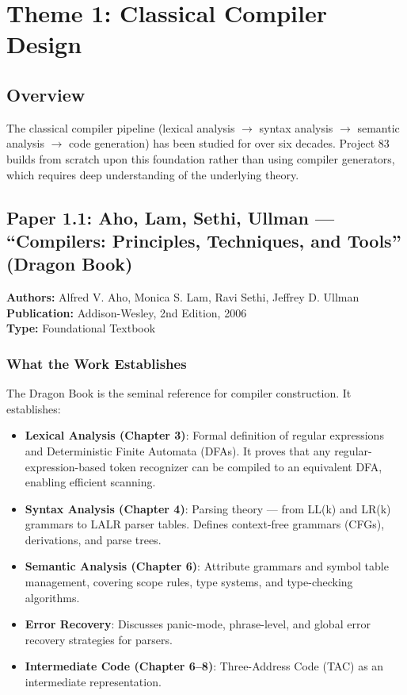 \documentclass[a4paper,11pt]{article}
\begin{document}
\section{Theme 1: Classical Compiler Design}

\subsection{Overview}

The classical compiler pipeline (lexical analysis $\rightarrow$ syntax analysis $\rightarrow$ semantic analysis $\rightarrow$ code generation) has been studied for over six decades. Project 83 builds from scratch upon this foundation rather than using compiler generators, which requires deep understanding of the underlying theory.

\subsection{Paper 1.1: Aho, Lam, Sethi, Ullman --- ``Compilers: Principles, Techniques, and Tools'' (Dragon Book)}

\begin{tcolorbox}[colback=gray!5, colframe=gray!40]
\textbf{Authors:} Alfred V. Aho, Monica S. Lam, Ravi Sethi, Jeffrey D. Ullman \\
\textbf{Publication:} Addison-Wesley, 2nd Edition, 2006 \\
\textbf{Type:} Foundational Textbook
\end{tcolorbox}

\subsubsection{What the Work Establishes}

The Dragon Book is the seminal reference for compiler construction. It establishes:
\begin{itemize}
    \item \textbf{Lexical Analysis (Chapter 3)}: Formal definition of regular expressions and Deterministic Finite Automata (DFAs). It proves that any regular-expression-based token recognizer can be compiled to an equivalent DFA, enabling efficient scanning.
    \item \textbf{Syntax Analysis (Chapter 4)}: Parsing theory --- from LL(k) and LR(k) grammars to LALR parser tables. Defines context-free grammars (CFGs), derivations, and parse trees.
    \item \textbf{Semantic Analysis (Chapter 6)}: Attribute grammars and symbol table management, covering scope rules, type systems, and type-checking algorithms.
    \item \textbf{Error Recovery}: Discusses panic-mode, phrase-level, and global error recovery strategies for parsers.
    \item \textbf{Intermediate Code (Chapter 6--8)}: Three-Address Code (TAC) as an intermediate representation.
\end{itemize}
\end{document}
